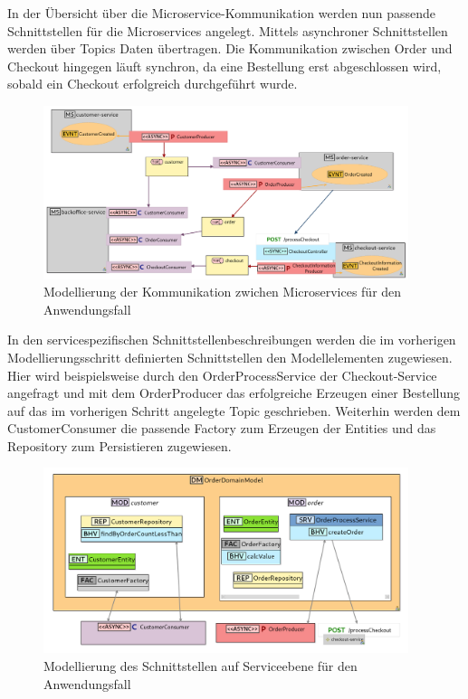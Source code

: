 \newpage


In der Übersicht über die Microservice-Kommunikation werden nun passende Schnittstellen für die Microservices angelegt. Mittels asynchroner Schnittstellen werden über Topics Daten übertragen. Die Kommunikation zwischen Order und Checkout hingegen läuft synchron, da eine Bestellung erst abgeschlossen wird, sobald ein Checkout erfolgreich durchgeführt wurde.


\begin{figure}[ht]
\centering
\includegraphics[width=0.95\textwidth]{bilder/k6/4.png}
\caption{Modellierung der Kommunikation zwichen Microservices für den Anwendungsfall}
\end{figure}


In den servicespezifischen Schnittstellenbeschreibungen werden die im vorherigen Modellierungsschritt definierten Schnittstellen den Modellelementen zugewiesen. Hier wird beispielsweise durch den \glqq OrderProcessService\grqq{} der Checkout-Service angefragt und mit dem \glqq OrderProducer\grqq{} das erfolgreiche Erzeugen einer Bestellung auf das im vorherigen Schritt angelegte Topic geschrieben. Weiterhin werden dem \glqq CustomerConsumer\grqq{} die passende Factory zum Erzeugen der Entities und das Repository zum Persistieren zugewiesen.

\begin{figure}[ht]
\centering
\includegraphics[width=0.95\textwidth]{bilder/k6/5.png}
\caption{Modellierung des Schnittstellen auf Serviceebene für den Anwendungsfall}
\end{figure}

